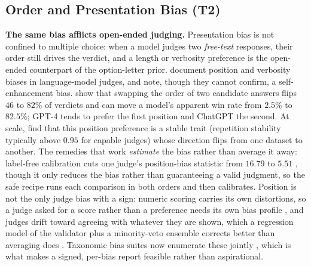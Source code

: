 \documentclass[11pt]{article}
\begin{document}
\subsection{Order and Presentation Bias (T2)}
\label{app:t2evidence}

\textbf{The same bias afflicts open-ended judging.} Presentation bias is not
confined to multiple choice: when a model judges two \emph{free-text}
responses, their order still drives the verdict, and a length or verbosity
preference is the open-ended counterpart of the option-letter prior.
\citet{zhengmt2023judging} document position and verbosity biases in
language-model judges, and note, though they cannot confirm, a
self-enhancement bias. \citet{wang2024fair} show that swapping the order of
two candidate answers flips $46$ to $82\%$ of verdicts and can move a model's
apparent win rate from $2.5\%$ to $82.5\%$; GPT-4 tends to prefer the first
position and ChatGPT the second. At scale, \citet{shi2025judging} find that
this position preference is a stable trait (repetition stability typically
above $0.95$ for capable judges) whose direction flips from one dataset to
another.
The remedies that work \emph{estimate} the bias rather than average it away:
label-free calibration cuts one judge's position-bias statistic from $16.79$ to
$5.51$ \cite{li2025calibraeval}, though it only reduces the bias rather than
guaranteeing a valid judgment, so the safe recipe runs each comparison in both
orders and then calibrates. Position is not the only judge bias with a sign:
numeric scoring carries its own distortions, so a judge asked for a score rather
than a preference needs its own bias profile \cite{li2026scoringbias}, and judges
drift toward agreeing with whatever they are shown, which a regression model of
the validator plus a minority-veto ensemble corrects better than averaging does
\cite{jain2025agreeableness}. Taxonomic bias suites now enumerate these jointly
\cite{zhou2026judgebias}, which is what makes a signed, per-bias report feasible
rather than aspirational.
\end{document}
